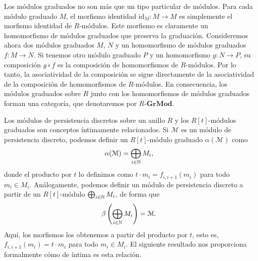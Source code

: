 Los módulos graduados no son más que un tipo particular de módulos. Para cada módulo graduado \( M \), el morfismo identidad \( \mathrm{id}_M : M \to M \) es simplemente el morfismo identidad de $R$-módulos. Este morfismo es claramente un homomorfismo de módulos graduados que preserva la graduación. Consideremos ahora dos módulos graduados \( M \), \( N \) y un homomorfismo de módulos graduados \( f: M \to N \). Si tenemos otro módulo graduado \( P \) y un homomorfismo \( g: N \to P \), su composición \( g \circ f \) es la composición de homomorfismos de $R$-módulos. Por lo tanto, la asociatividad de la composición se sigue directamente de la asociatividad de la composición de homomorfismos de $R$-módulos. En consecuencia, los módulos graduados sobre \( R \) junto con los homomorfismos de módulos graduados forman una categoría, que denotaremos por \( R\text{-}\mathbf{GrMod} \).

Los módulos de persistencia discretos sobre un anillo \(R\) y los \(R[t]\)-módulos graduados son conceptos íntimamente relacionados. Si \(\mathcal{M}\) es un módulo de persistencia discreto, podemos definir un \(R[t]\)-módulo graduado \(\alpha(\mathcal{M})\) como
\[
	\alpha(\mathcal{M}) = \bigoplus_{i \in \mathbb{N}} M_i,
\]
donde el producto por \(t\) lo definimos como \(t \cdot m_i = f_{i,i+1}(m_i)\) para todo \(m_i \in M_i\). Análogamente, podemos definir un módulo de persistencia discreto a partir de un \(R[t]\)-módulo \(\bigoplus_{i \in \mathbb{N}} M_i\), de forma que
\[
	\beta \left( \bigoplus_{i \in \mathbb{N}} M_i \right) = \mathcal{M}.
\]
Aquí, los morfismos los obtenemos a partir del producto por \(t\), esto es, \(f_{i, i+1}(m_i) = t \cdot m_i\) para todo \(m_i \in M_i\). El siguiente resultado nos proporciona formalmente cómo de íntima 
es esta relación.

